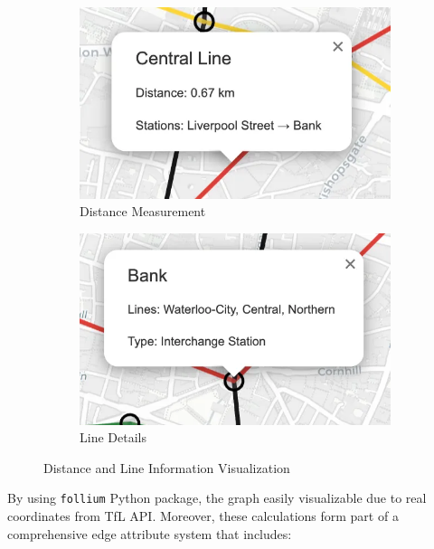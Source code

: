 \documentclass{article}
\begin{document}
\begin{figure}[H]
    \centering
    \begin{subfigure}[b]{0.48\textwidth}
        \centering
        \includegraphics[width=\linewidth]{Images/LineDistance.png}
        \caption{Distance Measurement}
        \label{fig:distance}
    \end{subfigure}
    \hfill
    \begin{subfigure}[b]{0.48\textwidth}
        \centering
        \includegraphics[width=\linewidth]{Images/LineDetails.png}
        \caption{Line Details}
        \label{fig:line_details}
    \end{subfigure}
    \caption{Distance and Line Information Visualization}
    \label{fig:distance_and_line}
\end{figure}

By using \texttt{follium} Python package, the graph easily visualizable due to real coordinates from TfL API. Moreover, these calculations form part of a comprehensive edge attribute system that includes:
\end{document}
